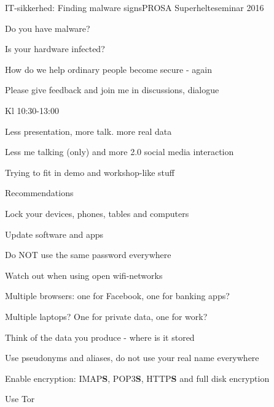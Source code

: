 \documentclass[20pt,landscape,a4paper,footrule]{foils}
\begin{document}



%

\mytitlepage
{IT-sikkerhed: Finding malware signs}{PROSA Superhelteseminar 2016}



\begin{list1}
\item Do you have malware?
\item Is your hardware infected?
\item How do we help ordinary people become secure - again
\end{list1}
\centerline{Please give feedback and join me in discussions, dialogue \smiley
}


\begin{list1}
\item Kl 10:30-13:00
\item Less presentation, more talk. more real data
\item Less me talking (only) and more 2.0 social media interaction
\end{list1}

\centerline{Trying to fit in demo and workshop-like stuff}


Recommendations 
\begin{list2}
\item Lock your devices, phones, tables and computers
\item Update software and apps
\item Do NOT use the same password everywhere
\item Watch out when using open wifi-networks
\item Multiple browsers: one for Facebook, one for banking apps?
\item Multiple laptops? One for private data, one for work?
\item Think of the data you produce - where is it stored
\item Use pseudonyms and aliases, do not use your real name everywhere
\item Enable encryption: IMAP{\bf S}, POP3{\bf S},
  HTTP{\bf S} and full disk encryption
\item Use Tor 
\end{list2}
\end{document}
